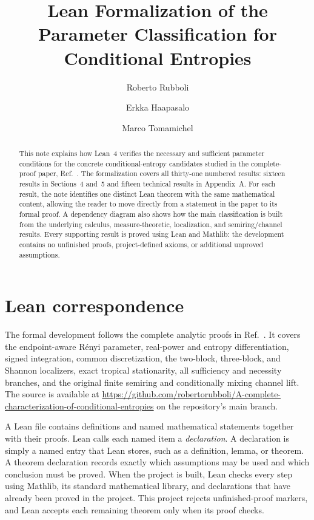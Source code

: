 \documentclass[aps,pra,11pt,onecolumn,nofootinbib,tightenlines]{revtex4-2}
\begin{document}
\title{Lean Formalization of the Parameter Classification for Conditional Entropies}

\begin{abstract}
This note explains how Lean~4 verifies the necessary and sufficient parameter
conditions for the concrete conditional-entropy candidates studied in the
complete-proof paper, Ref.~\cite{rubboli2026parametersFull}. The formalization
covers all thirty-one numbered results: sixteen results in Sections~4 and~5 and
fifteen technical results in Appendix~A. For each result, the note identifies
one distinct Lean theorem with the same mathematical content, allowing the
reader to move directly from a statement in the paper to its formal proof. A
dependency diagram also shows how the main classification is built from the
underlying calculus, measure-theoretic, localization, and semiring/channel
results. Every supporting result is proved using Lean and Mathlib: the
development contains no unfinished proofs, project-defined axioms, or
additional unproved assumptions.
\end{abstract}

\author{Roberto Rubboli}
\noaffiliation
\author{Erkka Haapasalo}
\noaffiliation
\author{Marco Tomamichel}
\noaffiliation

\maketitle

\section{Lean correspondence}
\label{sec:lean-correspondence}

The formal development follows the complete analytic proofs in
Ref.~\cite{rubboli2026parametersFull}. It covers the endpoint-aware R\'enyi parameter,
real-power and entropy differentiation, signed integration, common
discretization, the two-block, three-block, and Shannon localizers, exact
tropical stationarity, all sufficiency and necessity branches, and the
original finite semiring and conditionally mixing channel lift. The source is
available at
\url{https://github.com/robertorubboli/A-complete-characterization-of-conditional-entropies}
on the repository's main branch.

A Lean file contains definitions and named mathematical statements together
with their proofs. Lean calls each named item a \emph{declaration}. A
declaration is simply a named entry that Lean stores, such as a definition,
lemma, or theorem. A theorem declaration records exactly which assumptions may
be used and which conclusion must be proved. When the project is built, Lean
checks every step using
Mathlib, its standard mathematical library, and declarations that have already
been proved in the project. This project rejects unfinished-proof markers, and
Lean accepts each remaining theorem only when its proof checks.
\end{document}
